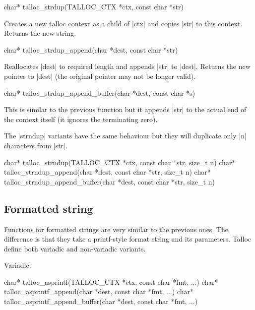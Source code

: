 \begin{funcproto}
char* talloc_strdup(TALLOC_CTX *ctx, const char *str)
\end{funcproto}
\begin{funcdesc}
  Creates a new talloc context as a child of |ctx| and copies |str| to
  this context. Returns the new string.
\end{funcdesc}
\begin{funcproto}
char* talloc_strdup_append(char *dest, const char *str)
\end{funcproto}
\begin{funcdesc}
  Reallocates |dest| to required length and appends |str| to |dest|. Returns the
  new pointer to |dest| (the original pointer may not be longer valid).
\end{funcdesc}
\begin{funcproto}
char* talloc_strdup_append_buffer(char *dest, const char *s)
\end{funcproto}
\begin{funcdesc}
  This is similar to the previous function but it appends |str| to the actual
  end of the context itself (it ignores the terminating zero).
\end{funcdesc}
\funclistend
The |strndup| variants have the same behaviour but they will duplicate only |n|
characters from |str|.

\begin{funcproto}
char* talloc_strndup(TALLOC_CTX *ctx, const char *str,
                     size_t n)
char* talloc_strndup_append(char *dest, const char *str,
                            size_t n)
char* talloc_strndup_append_buffer(char *dest, const char
                                   *str, size_t n)
\end{funcproto}

\subsection{Formatted string}

Functions for formatted strings are very similar to the previous ones. The
difference is that they take a printf-style format string and its parameters.
Talloc define both variadic and non-variadic variants.

Variadic:
\begin{funcproto}
char* talloc_asprintf(TALLOC_CTX *ctx, const char *fmt, ...)
char* talloc_asprintf_append(char *dest, const char *fmt,
                             ...)
char* talloc_asprintf_append_buffer(char *dest, const char
                                    *fmt, ...)
\end{funcproto}

